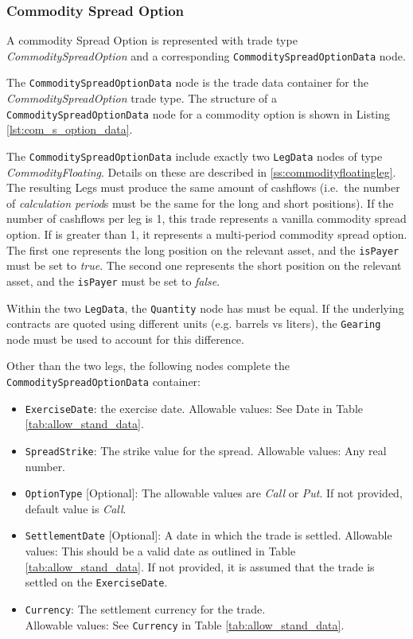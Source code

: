 \subsubsection{Commodity Spread Option}
\label{ss:input_commodity_spread_option}

A commodity Spread Option is represented with trade type  \emph{CommoditySpreadOption} and a corresponding
\lstinline!CommoditySpreadOptionData! node.

The \lstinline!CommoditySpreadOptionData! node is the trade data container for the \emph{CommoditySpreadOption} trade type.
The structure of a \lstinline!CommoditySpreadOptionData! node for a commodity option is shown in Listing \ref{lst:com_s_option_data}.

The \lstinline!CommoditySpreadOptionData! include exactly two \lstinline!LegData! nodes of type \emph{CommodityFloating}.
Details on these are described in \ref{ss:commodityfloatingleg}.
The resulting Legs must produce the same amount of cashflows (i.e.~the number of \emph{calculation period}s must be the same for the long and short positions).
If the number of cashflows per leg is 1, this trade represents a vanilla commodity spread option.
If is greater than 1, it represents a multi-period commodity spread option.
The first one represents the long position on the relevant asset, and the \lstinline!isPayer! must be set to \emph{true}.
The second one represents the short position on the relevant asset, and the \lstinline!isPayer! must be set to \emph{false}.

Within the two \lstinline!LegData!, the \lstinline!Quantity! node has must be equal.
If the underlying contracts are quoted using different units (e.g. barrels vs liters), the \lstinline!Gearing! node must be used to account for this difference.


Other than the two legs, the following nodes complete the \lstinline!CommoditySpreadOptionData! container:
\begin{itemize}
    \item \lstinline!ExerciseDate!: the exercise date. Allowable values: See Date in Table \ref{tab:allow_stand_data}.
    \item \lstinline!SpreadStrike!: The strike value for the spread. Allowable values: Any real number.
    \item \lstinline!OptionType! [Optional]: The allowable values are \emph{Call} or \emph{Put}. If not provided, default value is \emph{Call}.
    \item \lstinline!SettlementDate! [Optional]: A date in which the trade is settled.
Allowable values: This should be a valid date as outlined in Table \ref{tab:allow_stand_data}. If not provided, it is assumed that the trade is settled on the \lstinline!ExerciseDate!.
    \item \lstinline!Currency!: The settlement currency for the trade. \\
    Allowable values: See \lstinline!Currency! in Table \ref{tab:allow_stand_data}.
\end{itemize}

